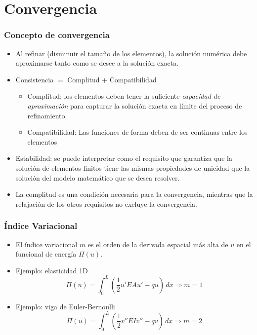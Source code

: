 \documentclass[handout]{beamer}
\begin{document}
\section{Convergencia}
\begin{frame}
\frametitle{Concepto de convergencia}
\begin{itemize}
\item Al refinar (disminuir el tamaño de los elementos), la solución numérica 
debe aproximarse tanto como se desee a la solución exacta. \pause
\item Consistencia $=$ Complitud $+$ Compatibilidad
\begin{itemize}
\item Complitud: los elementos deben tener la suficiente {\em capacidad
de aproximación} para capturar la solución exacta en límite del proceso
de refinamiento.
\item Compatibilidad: Las funciones de forma deben de ser continuas entre
los elementos \pause
\end{itemize}
\item Estabilidad: se puede interpretar como el requisito que garantiza que la
solución de elementos finitos tiene las mismas propiedades de unicidad que la
solución del modelo matemático que se desea resolver. \pause
\item La complitud es una condición necesaria para la convergencia,
mientras que la relajación de los otros requisitos no excluye la convergencia.
\end{itemize}
\end{frame}
\begin{frame}
\frametitle{Índice Variacional}
\begin{itemize}
\item El índice variacional $m$ es el orden de la derivada espacial más alta de
$u$ en el funcional de energía $\Pi(u)$.
\item Ejemplo: elasticidad 1D
$$
\Pi(u)=\int_{0}^L \left(\frac{1}{2} u'EAu'-qu \right ) \, dx
\Rightarrow m=1
$$
\item Ejemplo: viga de Euler-Bernoulli
$$
\Pi(u)=\int_{0}^L \left(\frac{1}{2} v''EIv''-qv \right ) \, dx
\Rightarrow m=2
$$
\end{itemize}
\end{frame}
\end{document}
